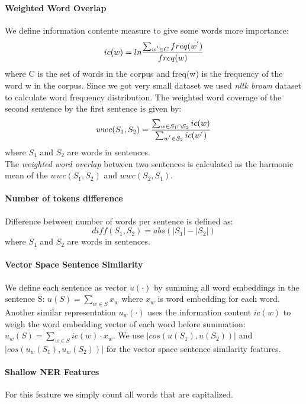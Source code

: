\documentclass[10pt, a4paper]{article}
\begin{document}
\paragraph{Weighted Word Overlap \\}
We define information contente measure to give some words more importance:
\begin{equation}\label{eq:inf-content}
ic(w) = ln \frac{\sum_{w^{\rq} \in C} freq(w^{\rq}) }{freq(w)}
\end{equation}
where C is the set of words in the corpus and
freq(w) is the frequency of the word w in the corpus. Since we got very small dataset we used \emph{nltk brown} dataset to calculate word frequency distribution.
The weighted word coverage of the second sentence by the first sentence is given by:
\begin{equation}\label{eq:wwc}
wwc(S_1, S_2) = \frac{\sum_{w \in S_1 \cap S_2} ic(w)}{\sum_{w^{\rq} \in S_2} ic(w^{\rq})}
\end{equation}
where $S_1$ and $S_2$ are words in sentences.\\
The \emph{weighted word overlap} between two sentences
is calculated as the harmonic mean of the
$wwc(S_1, S_2)$ and $wwc(S_2, S_1)$.\citep{Saric2012TakeLabSF}

\paragraph{Number of tokens difference \\}
Difference between number of words per sentence is defined as:
\begin{equation}\label{eq:word-diff}
diff(S_1, S_2) = abs(|S_1| - |S_2|)
\end{equation}
where $S_1$ and $S_2$ are words in sentences.
\paragraph{Vector Space Sentence Similarity \\}
We define each sentence as vector $u(\cdot)$ by summing all word embeddings in the sentence S: $ u(S) = \sum_{w \in S} x_w$ where $x_w$ is word embedding for each word. Another similar
representation $u_w(\cdot)$ uses the information content
$ic(w)$ to weigh the word embedding vector of each word
before summation: $u_w(S) = \sum_{w \in S} ic(w) \cdot x_w.$
We use $|cos(u(S_1), u(S_2))|$ and $|cos(u_w(S_1), u_w(S_2))|$ for the vector space sentence similarity features. \citep{Saric2012TakeLabSF}
\paragraph{Shallow NER Features \\}
For this feature we simply count all words that are capitalized.
\end{document}
